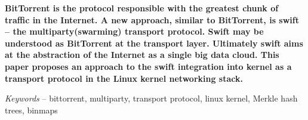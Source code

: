 {\bf
BitTorrent is the protocol responsible with the greatest chunk of traffic in the Internet. A new approach, similar to 
BitTorrent, is swift – the multiparty(swarming) transport protocol. Swift may be understood as BitTorrent at the
transport layer. Ultimately swift aims at the abstraction of the Internet as a single big data cloud. This paper
proposes an approach to the swift integration into kernel as a transport protocol in the Linux kernel networking
stack.

\emph{Keywords}  --  bittorrent, multiparty, transport protocol, linux kernel, Merkle hash trees, binmaps
}



